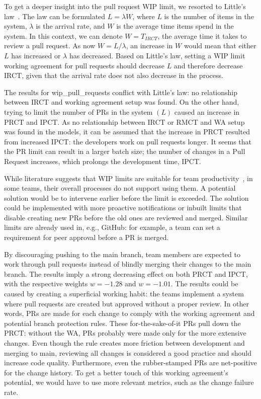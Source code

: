 To get a deeper insight into the pull request WIP limit, we resorted to Little's law~\cite{chhajed_building_2008}. The law can be formulated $L=\lambda W$, where $L$ is the number of items in the system, $\lambda$ is the arrival rate, and $W$ is the average time items spend in the system. In this context, we can denote $W=T_{IRCT}$, the average time it takes to review a pull request. As now $W=L/\lambda$, an increase in $W$ would mean that either $L$ has increased or $\lambda$ has decreased. Based on Little's law, setting a WIP limit working agreement for pull requests should decrease $L$ and therefore decrease IRCT, given that the arrival rate does not also decrease in the process. 

The results for wip\_pull\_requests conflict with Little's law: no relationship between IRCT and working agreement setup was found. On the other hand, trying to limit the number of PRs in the system $(L)$ caused an increase in PRCT and IPCT. As no relationship between IRCT or RMCT and WA setup was found in the models, it can be assumed that the increase in PRCT resulted from increased IPCT: the developers work on pull requests longer. It seems that the PR limit can result in a larger batch size; the number of changes in a Pull Request increases, which prolongs the development time, IPCT. 

While literature suggests that WIP limits are suitable for team productivity~\cite{reinertsen_principles_2009}, in some teams, their overall processes do not support using them. A potential solution would be to intervene earlier before the limit is exceeded. The solution could be implemented with more proactive notifications or inbuilt limits that disable creating new PRs before the old ones are reviewed and merged. Similar limits are already used in, e.g., GitHub: for example, a team can set a requirement for peer approval before a PR is merged. 

By discouraging pushing to the main branch, team members are expected to work through pull requests instead of blindly merging their changes to the main branch. The results imply a strong decreasing effect on both PRCT and IPCT, with the respective weights $w=-1.28$ and $w=-1.01$. The results could be caused by creating a superficial working habit: the teams implement a system where pull requests are created but approved without a proper review. In other words, PRs are made for each change to comply with the working agreement and potential branch protection rules. These for-the-sake-of-it PRs pull down the PRCT: without the WA, PRs probably were made only for the more extensive changes. Even though the rule creates more friction between development and merging to main, reviewing all changes is considered a good practice and should increase code quality. Furthermore, even the rubber-stamped PRs are net-positive for the change history. To get a better touch of this working agreement's potential, we would have to use more relevant metrics, such as the change failure rate. 

